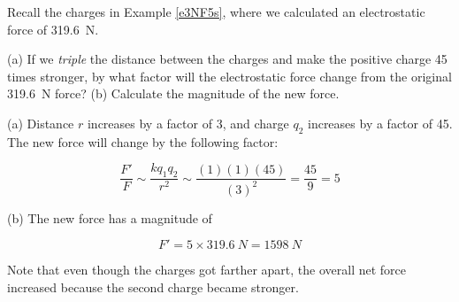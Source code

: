 \documentclass[main.tex]{subfiles}
\begin{document}
\begin{example}
Recall the charges in Example \ref{e3NF5s}, where we calculated an electrostatic force of \SI{319.6}{N}.
\vspace{-1em}

\begin{center}
\end{center}

(a) If we \textit{triple} the distance between the charges and make the positive charge 45 times stronger, by what factor will the electrostatic force change from the original \SI{319.6}{N} force? (b) Calculate the magnitude of the new force.
\end{example}

\Solution (a) Distance $r$ increases by a factor of 3, and charge $q_2$ increases by a factor of 45. The new force will change by the following factor:

\begin{equation*}
    \frac{F'}{F} \sim \frac{k q_1 q_2}{r^2} \sim \frac{(1)(1)(45)}{(3)^2} = \frac{45}{9} = 5
\end{equation*}

(b) The new force has a magnitude of 

\begin{equation*}
    F' = 5 \times \SI{319.6}{N} = \SI{1598}{N}
\end{equation*}

Note that even though the charges got farther apart, the overall net force increased because the second charge became stronger.
\end{document}
